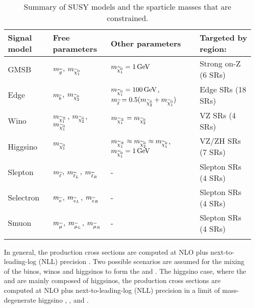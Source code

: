 \begin{table}[!hbtp]
\renewcommand{\arraystretch}{1.2}
\setlength{\belowcaptionskip}{6pt}
\small
\centering                             
\caption{Summary of SUSY models and the sparticle masses that are constrained.}
\begin{tabular}{l l l l}
\hline\hline
Signal model                         & Free parameters    & Other parameters & Targeted by region:    \\
\hline
GMSB                                 & $m_{\widetilde{g}}$, $m_{\widetilde{\chi}^{0}_{1}}$   & $m_{\widetilde{\chi}^{0}_{1}}=1\,\text{Ge\hspace{-.08em}V}$   & Strong on-Z (6 SRs)\\                          
Edge                                 & $m_{\widetilde{b}}$, $m_{\widetilde{\chi}^{0}_{2}}$  & $m_{\widetilde{\chi}^{0}_{1}}=100\,\text{Ge\hspace{-.08em}V}$, $m_{\widetilde{\ell}}=0.5(m_{\widetilde{\chi}^{0}_{2}}+m_{\widetilde{\chi}^{0}_{1}})$   & Edge SRs (18 SRs)\\                          
Wino                                 & $m_{\widetilde{\chi}^\pm_{1}}$, $m_{\widetilde{\chi}^{0}_{2}}$, $m_{\widetilde{\chi}^{0}_{1}}$  & $m_{\widetilde{\chi}^\pm_{1}}=m_{\widetilde{\chi}^{0}_{2}}$   & VZ SRs (4 SRs)\\                          
Higgsino                             & $m_{\widetilde{\chi}^{0}_{1}}$  & $m_{\widetilde{\chi}^\pm_{1}}\approx m_{\widetilde{\chi}^{0}_{2}}\approx m_{\widetilde{\chi}^{0}_{1}}$, $m_{\widetilde{\chi}^{0}_{1}}=1\,\text{Ge\hspace{-.08em}V}$   & VZ/ZH SRs (7 SRs)\\                          
Slepton                              & $m_{\widetilde{\ell}}$, $m_{\widetilde{\ell}_{L}}$, $m_{\widetilde{\ell}_{R}}$  & -   & Slepton SRs (4 SRs)\\                          
Selectron                            & $m_{\widetilde{e}}$, $m_{\widetilde{e}_{L}}$, $m_{\widetilde{e}_{R}}$  & -  & Slepton SRs (4 SRs)\\                          
Smuon                                & $m_{\widetilde{\mu}}$, $m_{\widetilde{\mu}_{L}}$, $m_{\widetilde{\mu}_{R}}$  & -   & Slepton SRs (4 SRs)\\                          
\hline\hline
\label{tab:signal}
\end{tabular}
\end{table}                                                                                                         
In general, the production cross sections are computed at NLO plus next-to-leading-log (NLL) precision \cite{Kulesza:2008jb, Kulesza:2009kq,Borschensky:2014cia}.
Two possible scenarios are assumed for the mixing of the binos, winos and higgsinos to form the \firstcharg and \secondchi. 
The higgsino case, where the \firstcharg and \secondchi are mainly composed of higgsinos, the production cross sections are computed at NLO plus next-to-leading-log (NLL) precision in a limit of mass-degenerate higgsino \firstcharg, \secondchi, and \firstchi \cite{Beenakker:1999xh,Fuks:2012qx, Fuks:2013vua}. 
